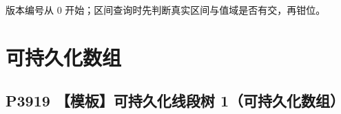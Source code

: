 \vspace{-0.9\baselineskip}
\begin{codeline}[firstnumber=185]
                    sum += 1 << (MAX_H - j);
                } else {
                }
            }
        }
        cout << (sum ^ b) << '\n';
    }
}
\end{codeline}
\begin{warnbox}
版本编号从 0 开始；区间查询时先判断真实区间与值域是否有交，再钳位。
\end{warnbox}

\section{可持久化数组}
\subsection{P3919 【模板】可持久化线段树 1（可持久化数组）}\label{p3919-ux6a21ux677fux53efux6301ux4e45ux5316ux7ebfux6bb5ux6811-1ux53efux6301ux4e45ux5316ux6570ux7ec4}


